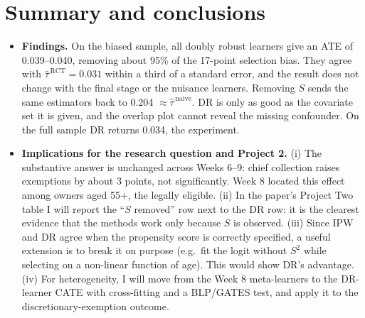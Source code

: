 \documentclass[11pt]{article}
\newcommand{\taurct}{\hat\tau^{\,\mathrm{RCT}}}
\newcommand{\taunaive}{\hat\tau^{\,\mathrm{naive}}}
\begin{document}
\section{Summary and conclusions}
\begin{itemize}
\item \textbf{Findings.} On the biased sample, all doubly robust learners give an ATE of 0.039--0.040, removing about 95\% of the 17-point selection bias. They agree with $\taurct=0.031$ within a third of a standard error, and the result does not change with the final stage or the nuisance learners. Removing $S$ sends the same estimators back to 0.204 $\approx\taunaive$. DR is only as good as the covariate set it is given, and the overlap plot cannot reveal the missing confounder. On the full sample DR returns 0.034, the experiment.
\item \textbf{Implications for the research question and Project 2.} (i) The substantive answer is unchanged across Weeks 6--9: chief collection raises exemptions by about 3 points, not significantly. Week 8 located this effect among owners aged 55+, the legally eligible. (ii) In the paper's Project Two table I will report the ``$S$ removed'' row next to the DR row: it is the clearest evidence that the methods work only because $S$ is observed. (iii) Since IPW and DR agree when the propensity score is correctly specified, a useful extension is to break it on purpose (e.g.\ fit the logit without $S^2$ while selecting on a non-linear function of age). This would show DR's advantage. (iv) For heterogeneity, I will move from the Week 8 meta-learners to the DR-learner CATE with cross-fitting and a BLP/GATES test, and apply it to the discretionary-exemption outcome.
\end{itemize}
\end{document}
